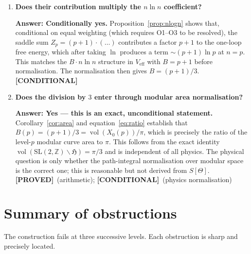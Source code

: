 \documentclass[12pt,a4paper]{article}
\theoremstyle{definition}
\theoremstyle{remark}
\newcommand{\PROVED}{\textcolor{green!50!black}{\textbf{[PROVED]}}}
\newcommand{\COND}  {\textcolor{blue!70!black} {\textbf{[CONDITIONAL]}}}
\newcommand{\SL}{\mathrm{SL}}
\newcommand{\vol}{\operatorname{vol}}
\newcommand{\bH}{\mathfrak{H}}     %
\newcommand{\ZZ}{\mathbb{Z}}
\newcommand{\Zp}{Z_p}
\begin{document}
\begin{enumerate}[label=Q\arabic*.]
\item \textbf{Does their contribution multiply the $n\ln n$ coefficient?}

  \textbf{Answer: Conditionally yes.}
  Proposition~\ref{prop:nlogn} shows that, conditional on equal weighting
  (which requires O1--O3 to be resolved), the saddle sum $\Zp=(p+1)\cdot(\ldots)$
  contributes a factor $p+1$ to the one-loop free energy, which after
  taking $\ln$ produces a term $\sim(p+1)\ln p$ at $n=p$.  This matches
  the $B\cdot n\ln n$ structure in $V_{\mathrm{eff}}$ with $B=p+1$ before
  normalisation.  The normalisation then gives $B=(p+1)/3$.
  \hfill\COND

\item \textbf{Does the division by $3$ enter through modular area normalisation?}

  \textbf{Answer: Yes — this is an exact, unconditional statement.}
  Corollary~\ref{cor:area} and equation~\eqref{eq:ratio} establish that
  $B(p)=(p+1)/3=\vol(X_0(p))/\pi$, which is precisely the ratio of the
  level-$p$ modular curve area to $\pi$.  This follows from the exact
  identity $\vol(\SL(2,\ZZ)\backslash\bH)=\pi/3$ and is independent of
  all physics.  The physical question is only whether the path-integral
  normalisation over modular space is the correct one; this is reasonable
  but not derived from $S[\Theta]$.
  \hfill\PROVED\ (arithmetic); \COND\ (physics normalisation)

\end{enumerate}

\section{Summary of obstructions}
\label{sec:obstructions}

The construction fails at three successive levels.  Each obstruction is
sharp and precisely located.
\end{document}
